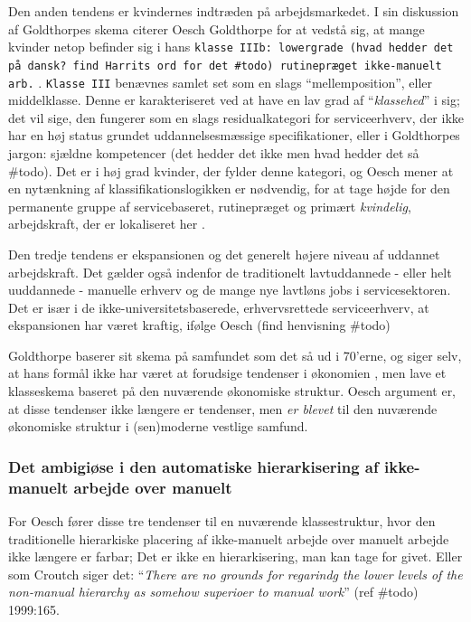 Den anden tendens er kvindernes indtræden på arbejdsmarkedet. I sin diskussion af Goldthorpes skema citerer Oesch Goldthorpe for at vedstå sig, at mange kvinder netop befinder sig i hans \texttt{klasse IIIb: lowergrade (hvad hedder det på dansk? find Harrits ord for det \#todo) rutinepræget ikke-manuelt arb.} \parencite[44]{Oesch2006a}. \texttt{Klasse III} benævnes samlet set som en slags “mellemposition”, eller middelklasse. Denne er karakteriseret ved at have en lav grad af “\emph{klassehed}” i sig; det vil sige, den fungerer som en slags residualkategori for serviceerhverv, der ikke har en høj status grundet uddannelsesmæssige specifikationer, eller i Goldthorpes jargon: sjældne kompetencer (det hedder det ikke men hvad hedder det så \#todo). Det er i høj grad kvinder, der fylder denne kategori, og Oesch mener at en nytænkning af klassifikationslogikken er nødvendig, for at tage højde for den permanente gruppe af servicebaseret, rutinepræget og primært \emph{kvindelig}, arbejdskraft, der er lokaliseret her \parencite[45]{Oesch2006a}. 

Den tredje tendens er ekspansionen og det generelt højere niveau af uddannet arbejdskraft. Det gælder også indenfor de traditionelt lavtuddannede - eller helt uuddannede - manuelle erhverv og de mange nye lavtløns jobs i servicesektoren. Det er især i de ikke-universitetsbaserede, erhvervsrettede serviceerhverv, at ekspansionen har været kraftig, ifølge Oesch (find henvisning \#todo)

Goldthorpe baserer sit skema på samfundet som det så ud i 70'erne, og siger selv, at hans formål ikke har været at forudsige tendenser i økonomien \parencite[48]{Oesch2006a}, men lave et klasseskema baseret på den nuværende økonomiske struktur. Oesch argument er, at disse tendenser ikke længere er tendenser, men \emph{er blevet} til den nuværende økonomiske struktur i (sen)moderne vestlige samfund. 

%
\subsubsection{Det ambigiøse i den automatiske hierarkisering af ikke-manuelt arbejde over manuelt}
%

For Oesch fører disse tre tendenser til en nuværende klassestruktur, hvor den traditionelle hierarkiske placering af ikke-manuelt arbejde over manuelt arbejde ikke længere er farbar; Det er ikke en hierarkisering, man kan tage for givet. Eller som Croutch siger det: “\emph{There are no grounds for regarindg the lower levels of the non-manual hierarchy as somehow superioer to manual work}” (ref \#todo) 1999:165. 

